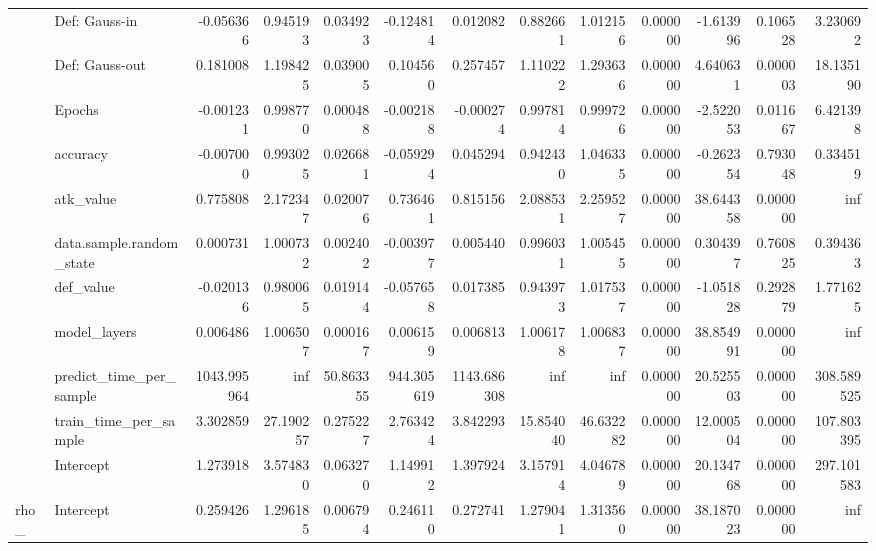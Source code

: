 \begin{table}[htbp]
\begin{tabular}{llrrrrrrrrrrr}
 & Def: Gauss-in & -0.056366 & 0.945193 & 0.034923 & -0.124814 & 0.012082 & 0.882661 & 1.012156 & 0.000000 & -1.613996 & 0.106528 & 3.230692 \\
 & Def: Gauss-out & 0.181008 & 1.198425 & 0.039005 & 0.104560 & 0.257457 & 1.110222 & 1.293636 & 0.000000 & 4.640631 & 0.000003 & 18.135190 \\
 & Epochs & -0.001231 & 0.998770 & 0.000488 & -0.002188 & -0.000274 & 0.997814 & 0.999726 & 0.000000 & -2.522053 & 0.011667 & 6.421398 \\
 & accuracy & -0.007000 & 0.993025 & 0.026681 & -0.059294 & 0.045294 & 0.942430 & 1.046335 & 0.000000 & -0.262354 & 0.793048 & 0.334519 \\
 & atk\_value & 0.775808 & 2.172347 & 0.020076 & 0.736461 & 0.815156 & 2.088531 & 2.259527 & 0.000000 & 38.644358 & 0.000000 & inf \\
 & data.sample.random\_state & 0.000731 & 1.000732 & 0.002402 & -0.003977 & 0.005440 & 0.996031 & 1.005455 & 0.000000 & 0.304397 & 0.760825 & 0.394363 \\
 & def\_value & -0.020136 & 0.980065 & 0.019144 & -0.057658 & 0.017385 & 0.943973 & 1.017537 & 0.000000 & -1.051828 & 0.292879 & 1.771625 \\
 & model\_layers & 0.006486 & 1.006507 & 0.000167 & 0.006159 & 0.006813 & 1.006178 & 1.006837 & 0.000000 & 38.854991 & 0.000000 & inf \\
 & predict\_time\_per\_sample & 1043.995964 & inf & 50.863355 & 944.305619 & 1143.686308 & inf & inf & 0.000000 & 20.525503 & 0.000000 & 308.589525 \\
 & train\_time\_per\_sample & 3.302859 & 27.190257 & 0.275227 & 2.763424 & 3.842293 & 15.854040 & 46.632282 & 0.000000 & 12.000504 & 0.000000 & 107.803395 \\
 & Intercept & 1.273918 & 3.574830 & 0.063270 & 1.149912 & 1.397924 & 3.157914 & 4.046789 & 0.000000 & 20.134768 & 0.000000 & 297.101583 \\
\cline{1-13}
rho\_ & Intercept & 0.259426 & 1.296185 & 0.006794 & 0.246110 & 0.272741 & 1.279041 & 1.313560 & 0.000000 & 38.187023 & 0.000000 & inf \\
\cline{1-13}
\bottomrule
\end{tabular}
\end{table}
